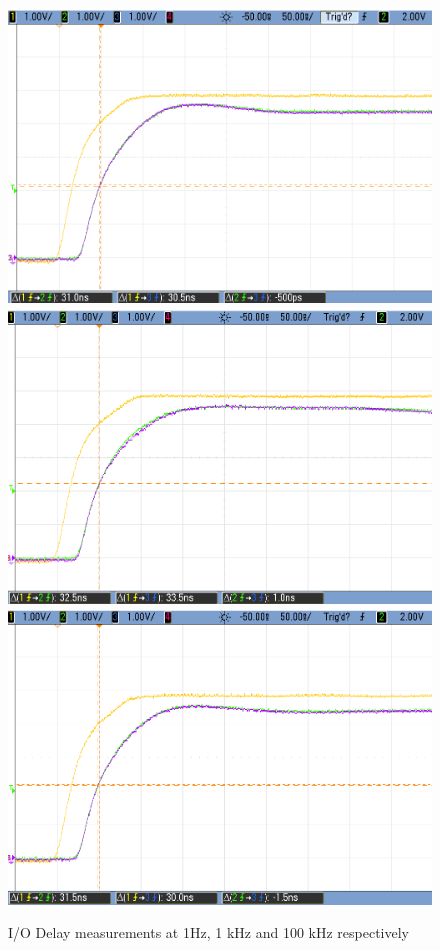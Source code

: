 \begin{figure}[ht]
    \begin{center}
        \includegraphics[width=0.75\linewidth]{./images/e3e1_1.png}
        \includegraphics[width=0.75\linewidth]{./images/e3e1_1k.png}
        \includegraphics[width=0.75\linewidth]{./images/e3e1_100k_.png}
        \caption{I/O Delay measurements at 1Hz, 1 kHz and 100 kHz respectively}
        \label{fig:moore_delays}
    \end{center}
\end{figure}

